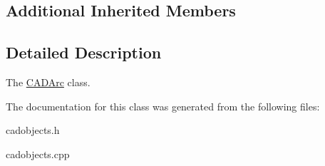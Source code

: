 \subsection*{Additional Inherited Members}


\subsection{Detailed Description}
The \hyperlink{class_c_a_d_arc}{C\+A\+D\+Arc} class. 

The documentation for this class was generated from the following files\+:\begin{DoxyCompactItemize}
\item 
cadobjects.\+h\item 
cadobjects.\+cpp\end{DoxyCompactItemize}
